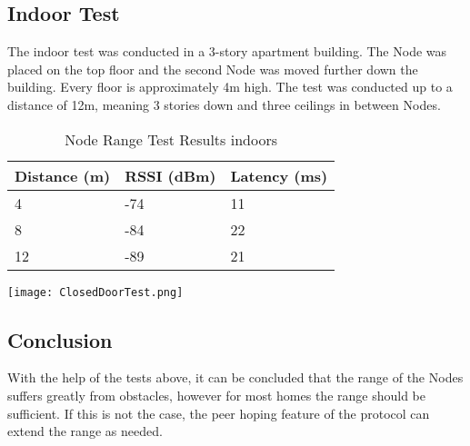     \subsection{Indoor Test}
    The indoor test was conducted in a 3-story apartment building.
    The Node was placed on the top floor and the second Node was
    moved further down the building. Every floor is approximately
    4m high. The test was conducted up to a distance of 12m, meaning 
    3 stories down and three ceilings in between Nodes.
    \vspace{1cm}

    \begin{table}[H]
        \centering
        \begin{minipage}{0.40\textwidth} %
            \centering
            \begin{tabular}{|p{2cm}|p{1.6cm}|p{1.6cm}|}
                \hline
                \textbf{Distance (m)} & \textbf{RSSI (dBm)} & \textbf{Latency (ms)} \\ \hline
                4   & -74 & 11 \\ \hline
                8   & -84 & 22 \\ \hline
                12  & -89 & 21 \\ \hline
            \end{tabular}
            \label{tab:node_range_test}
        \end{minipage}%
        \hfill %
        \begin{minipage}{0.55\textwidth} %
            \centering
            \texttt{[image: ClosedDoorTest.png]}
            \label{fig:indoor_node_range_test}
        \end{minipage}
        \caption{Node Range Test Results indoors}
    \end{table}

    \subsection{Conclusion}
    With the help of the tests above, it can be concluded that
    the range of the Nodes suffers greatly from obstacles, however
    for most homes the range should be sufficient. If this is not the
    case, the peer hoping feature of the protocol can extend the range
    as needed.

